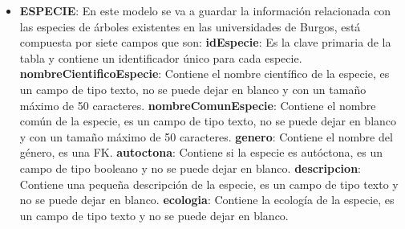 \begin{itemize}
	\item \textbf{ESPECIE}: En este modelo se va a guardar la información relacionada con las especies de árboles existentes en las universidades de Burgos, está compuesta por siete campos que son:
	\subitem \textbf{idEspecie}: Es la clave primaria de la tabla y contiene un identificador único para cada especie.
	\subitem \textbf{nombreCientificoEspecie}: Contiene el nombre científico de la especie, es un campo de tipo texto, no se puede dejar en blanco y con un tamaño máximo de 50 caracteres. 
	\subitem \textbf{nombreComunEspecie}: Contiene el nombre común de la especie, es un campo de tipo texto, no se puede dejar en blanco y con un tamaño máximo de 50 caracteres. 
	\subitem \textbf{genero}: Contiene el nombre del género, es una FK.
	\subitem \textbf{autoctona}: Contiene si la especie es autóctona, es un campo de tipo booleano y no se puede dejar en blanco.
	\subitem \textbf{descripcion}: Contiene una pequeña descripción de la especie, es un campo de tipo texto y no se puede dejar en blanco.
	\subitem \textbf{ecologia}: Contiene la ecología de la especie, es un campo de tipo texto y no se puede dejar en blanco.
\end{itemize}


